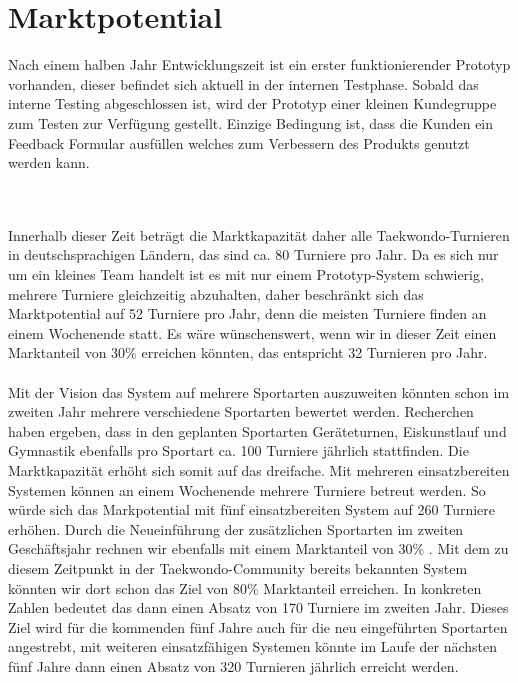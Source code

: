 \section{Marktpotential}\label{marktpotential}

Nach einem halben Jahr Entwicklungszeit ist ein erster funktionierender Prototyp vorhanden, dieser befindet sich aktuell in
der internen Testphase.
Sobald das interne Testing abgeschlossen ist, wird der Prototyp einer kleinen Kundegruppe zum Testen zur Verfügung gestellt.
Einzige Bedingung ist, dass die Kunden ein Feedback Formular ausfüllen welches zum Verbessern des Produkts genutzt
werden kann.

\\\\
Innerhalb dieser Zeit beträgt die Marktkapazität daher alle Taekwondo-Turnieren in deutschsprachigen Ländern, das
sind ca. 80 Turniere pro Jahr.
Da es sich nur um ein kleines Team handelt ist es mit nur einem Prototyp-System schwierig, mehrere Turniere
	gleichzeitig abzuhalten, daher beschränkt sich das Marktpotential auf 52 Turniere pro Jahr, denn die meisten
	Turniere finden an einem Wochenende statt.
Es wäre wünschenswert, wenn wir in dieser Zeit einen Marktanteil von 30\% erreichen könnten, das entspricht 32
	Turnieren pro Jahr.
\\\\
Mit der Vision das System auf mehrere Sportarten auszuweiten könnten schon im zweiten Jahr mehrere verschiedene
	Sportarten bewertet werden.
Recherchen haben ergeben, dass in den geplanten Sportarten Geräteturnen, Eiskunstlauf und Gymnastik ebenfalls pro
	Sportart ca. 100 Turniere jährlich stattfinden.
Die Marktkapazität erhöht sich somit auf das dreifache.
Mit mehreren einsatzbereiten Systemen können an einem Wochenende mehrere Turniere betreut werden.
So würde sich das Markpotential mit fünf einsatzbereiten System auf 260 Turniere erhöhen.
Durch die Neueinführung der zusätzlichen Sportarten im zweiten Geschäftsjahr rechnen wir ebenfalls mit einem
	Marktanteil von 30\% .
Mit dem zu diesem Zeitpunkt in der Taekwondo-Community bereits bekannten System könnten wir dort schon das Ziel von
	80\% Marktanteil erreichen.
In konkreten Zahlen bedeutet das dann einen Absatz von 170 Turniere im zweiten Jahr.
Dieses Ziel wird für die kommenden fünf Jahre auch für die neu eingeführten Sportarten angestrebt, mit weiteren
	einsatzfähigen Systemen könnte im Laufe der nächsten fünf Jahre dann einen Absatz von 320 Turnieren jährlich
	erreicht werden.


